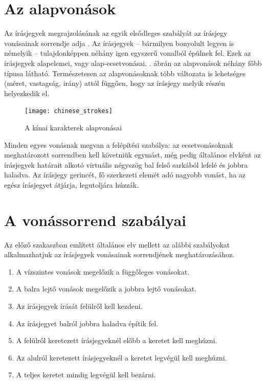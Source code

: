 
\section{Az alapvonások}

Az írásjegyek megrajzolásának az egyik elsődleges szabályát az írásjegy vonásainak sorrendje adja \cite{kinaiiras}. Az írásjegyek -- bármilyen bonyolult legyen is némelyik -- tulajdonképpen néhány igen egyszerű vonalból épülnek fel. Ezek az írásjegyek alapelemei, vagy alap-ecsetvonásai. . ábrán az alapvonások néhány főbb típusa látható. Természetesen az alapvonásoknak több változata is lehetséges (méret, vastagság, irány) attól függően, hogy az írásjegy melyik részén helyezkedik el.

\begin{figure}[h]
	\centering
	\texttt{[image: chinese\_strokes]}
	\caption{A kínai karakterek alapvonásai}
	\label{fig:alapvonasok}
\end{figure}

Minden egyes vonásnak megvan a felépítési szabálya: az ecsetvonásoknak meghatározott sorrendben kell követniük egymást, még pedig általános elvként az írásjegyek határait alkotó virtuális négyszög bal felső sarkából lefelé és jobbra haladva. Az írásjegy gerincét, fő szerkezeti elemét adó nagyobb vonást, ha az egész írásjegyet átjárja, legutoljára húzzák.

\section{A vonássorrend szabályai}

Az előző szakaszban említett általános elv mellett az alábbi szabályokat alkalmazhatjuk az írásjegyek vonásainak sorrendjének meghatározásához.
\begin{enumerate}
	\item A vízszintes vonások megelőzik a függőleges vonásokat.
	\item A balra lejtő vonások megelőzik a jobbra lejtő vonásokat. 
	\item Az írásjegyek írását felülről kell kezdeni. 
	\item Az írásjegyet balról jobbra haladva építik fel. 
	\item A felülről keretezett írásjegyeknél előbb a keretet kell meghúzni. 
	\item Az alulról keretezett írásjegyeknél a keretet legvégül kell meghúzni. 
	\item A teljes keretet mindig legvégül kell bezárni.
\end{enumerate}

